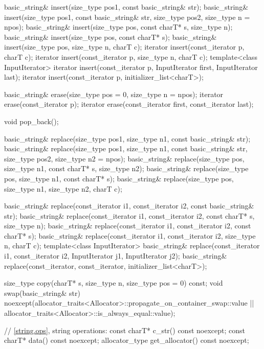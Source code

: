 \begin{codeblock}
{{    basic_string& insert(size_type pos1, const basic_string& str);
    basic_string& insert(size_type pos1, const basic_string& str,
                         size_type pos2, size_type n = npos);
    basic_string& insert(size_type pos, const charT* s, size_type n);
    basic_string& insert(size_type pos, const charT* s);
    basic_string& insert(size_type pos, size_type n, charT c);
    iterator insert(const_iterator p, charT c);
    iterator insert(const_iterator p, size_type n, charT c);
    template<class InputIterator>
      iterator insert(const_iterator p, InputIterator first, InputIterator last);
    iterator insert(const_iterator p, initializer_list<charT>);

    basic_string& erase(size_type pos = 0, size_type n = npos);
    iterator erase(const_iterator p);
    iterator erase(const_iterator first, const_iterator last);

    void pop_back();

    basic_string& replace(size_type pos1, size_type n1,
                          const basic_string& str);
    basic_string& replace(size_type pos1, size_type n1,
                          const basic_string& str,
                          size_type pos2, size_type n2 = npos);
    basic_string& replace(size_type pos, size_type n1, const charT* s,
                          size_type n2);
    basic_string& replace(size_type pos, size_type n1, const charT* s);
    basic_string& replace(size_type pos, size_type n1, size_type n2,
                          charT c);

    basic_string& replace(const_iterator i1, const_iterator i2,
              const basic_string& str);
    basic_string& replace(const_iterator i1, const_iterator i2, const charT* s,
                          size_type n);
    basic_string& replace(const_iterator i1, const_iterator i2, const charT* s);
    basic_string& replace(const_iterator i1, const_iterator i2,
                          size_type n, charT c);
    template<class InputIterator>
      basic_string& replace(const_iterator i1, const_iterator i2,
                            InputIterator j1, InputIterator j2);
    basic_string& replace(const_iterator, const_iterator, initializer_list<charT>);

    size_type copy(charT* s, size_type n, size_type pos = 0) const;
    void swap(basic_string& str)
      noexcept(allocator_traits<Allocator>::propagate_on_container_swap::value ||
               allocator_traits<Allocator>::is_always_equal::value);

    // \ref{string.ops}, string operations:
    const charT* c_str() const noexcept;
    const charT* data() const noexcept;
    allocator_type get_allocator() const noexcept;

}}
\end{codeblock}
